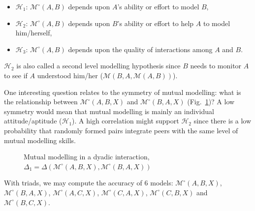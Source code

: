 \documentclass[natbib]{svjour3}
\newcommand{\Model}[3]{{$\mathcal{M}^{\circ}(#1, #2, #3)$}}
\begin{document}
\begin{itemize}
    \item $\mathcal{H}_{1}$: $\mathcal{M}^{\circ}(A,B)$ depends upon $A$'s ability or effort
        to model $B$,
    
    \item $\mathcal{H}_{2}$: $\mathcal{M}^{\circ}(A,B)$ depends upon  $B$'s ability or
        effort to help $A$ to model him/herself,

    \item $\mathcal{H}_{3}$: $\mathcal{M}^{\circ}(A,B)$ depends upon the quality of
        interactions among $A$ and $B$.

\end{itemize}



$\mathcal{H}_{2}$ is also called a second level modelling hypothesis since $B$
needs to monitor $A$ to see if $A$ understood him/her
($\mathcal{M}(B,A,\mathcal{M}(A,B))$).

One interesting question relates to the symmetry of mutual modelling: what is
the relationship between \Model{A}{B}{X} and
\Model{B}{A}{X} (Fig.~\ref{mm_symmetry})? A low symmetry would mean that mutual modelling is mainly an
individual attitude/aptitude ($\mathcal{H}_{1}$). A high correlation might
support $\mathcal{H}_{2}$ since there is a low probability that randomly formed
pairs integrate peers with the same level of mutual modelling skills.

\begin{figure}[htb]
\centering


\caption{\small Mutual modelling in a dyadic interaction, $\Delta_1 =
    \Delta(\mathcal{M}^{\circ} (A,B,X),
\mathcal{M}^{\circ} (B,A,X))$}

\label{mm_symmetry}
\end{figure}


With triads, we may compute the accuracy of 6 models:
\Model{A}{B}{X}, \Model{B}{A}{X}, \Model{A}{C}{X}, \Model{C}{A}{X},
\Model{C}{B}{X} and \Model{B}{C}{X}.
\end{document}
